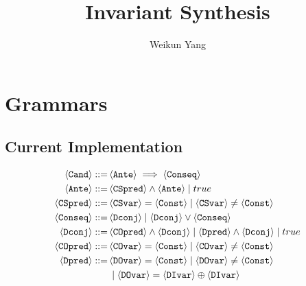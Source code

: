\documentclass[10pt,conference]{article}
\numberwithin{equation}{section}
\newcommand{\tuple}[1]{\langle #1 \rangle}
\begin{document}
%
\title{Invariant Synthesis}
%
\pagestyle{plain}
%
\author{Weikun Yang}


\maketitle              %


\section{Grammars}

\subsection{Current Implementation}

\begin{align}
\tuple{\texttt{Cand}} ::=\, & \tuple{\texttt{Ante}} \implies \tuple{\texttt{Conseq}} \\
\tuple{\texttt{Ante}} ::=\, & \tuple{\texttt{CSpred}} \land \tuple{\texttt{Ante}} \mid true\\
\tuple{\texttt{CSpred}} ::=\, & \tuple{\texttt{CSvar}} = \tuple{\texttt{Const}} \mid \tuple{\texttt{CSvar}} \neq \tuple{\texttt{Const}} \\
\tuple{\texttt{Conseq}} ::=\, & \tuple{\texttt{Dconj}} \mid \tuple{\texttt{Dconj}} \lor \tuple{\texttt{Conseq}} \\
\tuple{\texttt{Dconj}} ::=\, & \tuple{\texttt{COpred}} \land \tuple{\texttt{Dconj}} \mid \tuple{\texttt{Dpred}} \land \tuple{\texttt{Dconj}} \mid true\\
\tuple{\texttt{COpred}} ::=\, & \tuple{\texttt{COvar}} = \tuple{\texttt{Const}} \mid \tuple{\texttt{COvar}} \neq \tuple{\texttt{Const}}\\
\tuple{\texttt{Dpred}} ::=\, & \tuple{\texttt{DOvar}} = \tuple{\texttt{Const}} \mid \tuple{\texttt{DOvar}} \neq \tuple{\texttt{Const}} \\
& \mid \tuple{\texttt{DOvar}} = \tuple{\texttt{DIvar}} \oplus \tuple{\texttt{DIvar}} \notag
\end{align}
\end{document}
